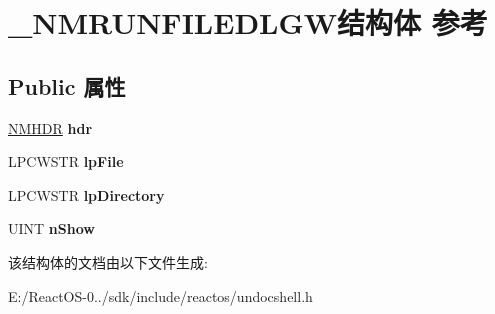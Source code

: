 \hypertarget{struct___n_m_r_u_n_f_i_l_e_d_l_g_w}{}\section{\+\_\+\+N\+M\+R\+U\+N\+F\+I\+L\+E\+D\+L\+G\+W结构体 参考}
\label{struct___n_m_r_u_n_f_i_l_e_d_l_g_w}
\subsection*{Public 属性}
\begin{DoxyCompactItemize}
\item 
\mbox{\label{struct___n_m_r_u_n_f_i_l_e_d_l_g_w_a69a349736c49aac2205145cadbf28e63}} 
\hyperlink{structtag_n_m_h_d_r}{N\+M\+H\+DR} {\bfseries hdr}
\item 
\mbox{\label{struct___n_m_r_u_n_f_i_l_e_d_l_g_w_a308e27ef4a148ce9938888a663b77cf0}} 
L\+P\+C\+W\+S\+TR {\bfseries lp\+File}
\item 
\mbox{\label{struct___n_m_r_u_n_f_i_l_e_d_l_g_w_abf9410cf781ee85d1e1d6fef264723fb}} 
L\+P\+C\+W\+S\+TR {\bfseries lp\+Directory}
\item 
\mbox{\label{struct___n_m_r_u_n_f_i_l_e_d_l_g_w_a6f8af6ddeec36b9ff017ab21687e3857}} 
U\+I\+NT {\bfseries n\+Show}
\end{DoxyCompactItemize}


该结构体的文档由以下文件生成\+:\begin{DoxyCompactItemize}
\item 
E\+:/\+React\+O\+S-\/0../sdk/include/reactos/undocshell.\+h\end{DoxyCompactItemize}
